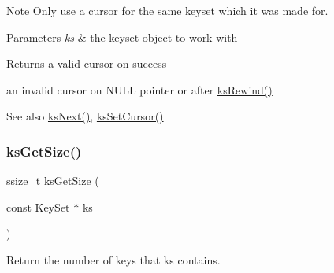 \begin{DoxyCodeInclude}{0}
\DoxyCodeLine{}
\DoxyCodeLine{        \{}
\DoxyCodeLine{        \}}
\end{DoxyCodeInclude}


\begin{DoxyNote}{Note}
Only use a cursor for the same keyset which it was made for.
\end{DoxyNote}

\begin{DoxyParams}{Parameters}
{\em ks} & the keyset object to work with \\
\hline
\end{DoxyParams}
\begin{DoxyReturn}{Returns}
a valid cursor on success 

an invalid cursor on N\+U\+LL pointer or after \mbox{\hyperlink{group__keyset_gabe793ff51f1728e3429c84a8a9086b70}{ks\+Rewind()}} 
\end{DoxyReturn}
\begin{DoxySeeAlso}{See also}
\mbox{\hyperlink{group__keyset_ga317321c9065b5a4b3e33fe1c399bcec9}{ks\+Next()}}, \mbox{\hyperlink{group__keyset_gad94c9ffaa3e8034564c0712fd407c345}{ks\+Set\+Cursor()}} 
\end{DoxySeeAlso}
\mbox{\label{group__keyset_ga7474ad6b0a0fa969dbdf267ba5770eee}} 
\subsubsection{\texorpdfstring{ksGetSize()}{ksGetSize()}}
{\footnotesize\ttfamily ssize\+\_\+t ks\+Get\+Size (\begin{DoxyParamCaption}\item[{const Key\+Set $\ast$}]{ks }\end{DoxyParamCaption})}



Return the number of keys that {\ttfamily ks} contains. 


